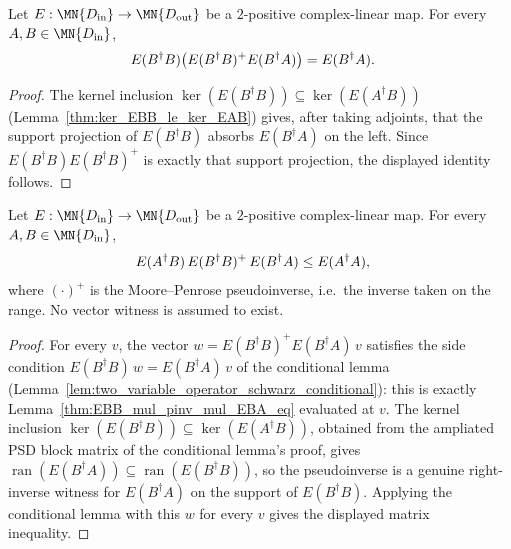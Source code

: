 \begin{theorem}
    \label{thm:EBB_mul_pinv_mul_EBA_eq}
    \leanok
    Let $E:\MN{D_{\rm in}}\to\MN{D_{\rm out}}$ be a $2$-positive
    complex-linear map. For every $A,B\in\MN{D_{\rm in}}$,
    \begin{align}
        E(B^\dagger B)\bigl(E(B^\dagger B)^{+}E(B^\dagger A)\bigr)
         & = E(B^\dagger A).
        \notag
    \end{align}
\end{theorem}

\begin{proof}\leanok
    The kernel inclusion $\ker(E(B^\dagger B))\subseteq\ker(E(A^\dagger B))$
    (Lemma~\ref{thm:ker_EBB_le_ker_EAB}) gives, after taking adjoints, that
    the support projection of $E(B^\dagger B)$ absorbs $E(B^\dagger A)$ on
    the left. Since $E(B^\dagger B)E(B^\dagger B)^{+}$ is exactly that
    support projection, the displayed identity follows.
\end{proof}

\begin{theorem}
    \label{thm:two_variable_operator_schwarz}
    \leanok
    Let $E:\MN{D_{\rm in}}\to\MN{D_{\rm out}}$ be a $2$-positive
    complex-linear map. For every $A,B\in\MN{D_{\rm in}}$,
    \begin{align}
        E(A^\dagger B)\,E(B^\dagger B)^{+}\,E(B^\dagger A)
         & \le E(A^\dagger A),
        \notag
    \end{align}
    where $(\cdot)^+$ is the Moore--Penrose pseudoinverse, i.e.\ the
    inverse taken on the range. No vector witness is assumed to exist.
\end{theorem}

\begin{proof}\leanok
    For every $v$, the vector $w = E(B^\dagger B)^{+}E(B^\dagger A)\,v$
    satisfies the side condition $E(B^\dagger B)\,w = E(B^\dagger A)\,v$ of
    the conditional lemma
    (Lemma~\ref{lem:two_variable_operator_schwarz_conditional}): this is
    exactly Lemma~\ref{thm:EBB_mul_pinv_mul_EBA_eq} evaluated at $v$. The
    kernel inclusion $\ker(E(B^\dagger B))\subseteq\ker(E(A^\dagger B))$,
    obtained from the ampliated PSD block matrix of the conditional
    lemma's proof,
    gives $\operatorname{ran}(E(B^\dagger A))\subseteq
    \operatorname{ran}(E(B^\dagger B))$, so the pseudoinverse is a genuine
    right-inverse witness for $E(B^\dagger A)$ on the support of
    $E(B^\dagger B)$. Applying the conditional lemma with this $w$ for
    every $v$ gives the displayed matrix inequality.
\end{proof}

